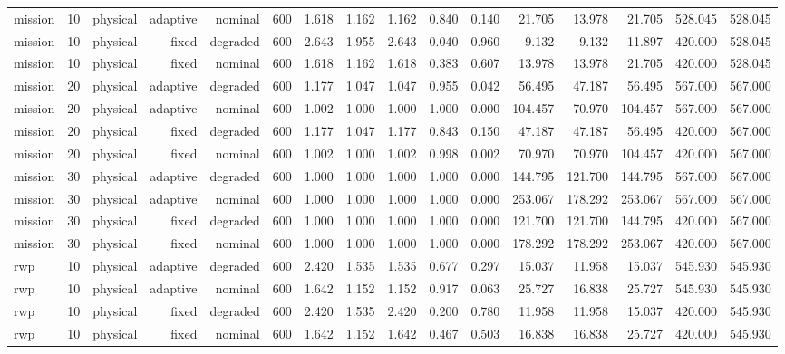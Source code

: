 \begin{tabular}{lrrrrrrrrrrrrrrr}
mission & 10 & physical & adaptive & nominal & 600 & 1.618 & 1.162 & 1.162 & 0.840 & 0.140 & 21.705 & 13.978 & 21.705 & 528.045 & 528.045 \\
mission & 10 & physical & fixed & degraded & 600 & 2.643 & 1.955 & 2.643 & 0.040 & 0.960 & 9.132 & 9.132 & 11.897 & 420.000 & 528.045 \\
mission & 10 & physical & fixed & nominal & 600 & 1.618 & 1.162 & 1.618 & 0.383 & 0.607 & 13.978 & 13.978 & 21.705 & 420.000 & 528.045 \\
mission & 20 & physical & adaptive & degraded & 600 & 1.177 & 1.047 & 1.047 & 0.955 & 0.042 & 56.495 & 47.187 & 56.495 & 567.000 & 567.000 \\
mission & 20 & physical & adaptive & nominal & 600 & 1.002 & 1.000 & 1.000 & 1.000 & 0.000 & 104.457 & 70.970 & 104.457 & 567.000 & 567.000 \\
mission & 20 & physical & fixed & degraded & 600 & 1.177 & 1.047 & 1.177 & 0.843 & 0.150 & 47.187 & 47.187 & 56.495 & 420.000 & 567.000 \\
mission & 20 & physical & fixed & nominal & 600 & 1.002 & 1.000 & 1.002 & 0.998 & 0.002 & 70.970 & 70.970 & 104.457 & 420.000 & 567.000 \\
mission & 30 & physical & adaptive & degraded & 600 & 1.000 & 1.000 & 1.000 & 1.000 & 0.000 & 144.795 & 121.700 & 144.795 & 567.000 & 567.000 \\
mission & 30 & physical & adaptive & nominal & 600 & 1.000 & 1.000 & 1.000 & 1.000 & 0.000 & 253.067 & 178.292 & 253.067 & 567.000 & 567.000 \\
mission & 30 & physical & fixed & degraded & 600 & 1.000 & 1.000 & 1.000 & 1.000 & 0.000 & 121.700 & 121.700 & 144.795 & 420.000 & 567.000 \\
mission & 30 & physical & fixed & nominal & 600 & 1.000 & 1.000 & 1.000 & 1.000 & 0.000 & 178.292 & 178.292 & 253.067 & 420.000 & 567.000 \\
rwp & 10 & physical & adaptive & degraded & 600 & 2.420 & 1.535 & 1.535 & 0.677 & 0.297 & 15.037 & 11.958 & 15.037 & 545.930 & 545.930 \\
rwp & 10 & physical & adaptive & nominal & 600 & 1.642 & 1.152 & 1.152 & 0.917 & 0.063 & 25.727 & 16.838 & 25.727 & 545.930 & 545.930 \\
rwp & 10 & physical & fixed & degraded & 600 & 2.420 & 1.535 & 2.420 & 0.200 & 0.780 & 11.958 & 11.958 & 15.037 & 420.000 & 545.930 \\
rwp & 10 & physical & fixed & nominal & 600 & 1.642 & 1.152 & 1.642 & 0.467 & 0.503 & 16.838 & 16.838 & 25.727 & 420.000 & 545.930 \\

\end{tabular}
